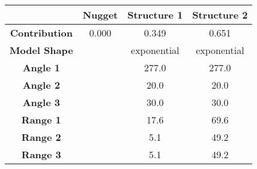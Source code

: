 \begin{tabular}{cccc}
\toprule
{} & Nugget &  Structure 1 &  Structure 2 \\
\midrule
\textbf{Contribution} &  0.000 &        0.349 &        0.651 \\
\textbf{Model Shape } &        &  exponential &  exponential \\
\textbf{Angle 1     } &        &        277.0 &        277.0 \\
\textbf{Angle 2     } &        &         20.0 &         20.0 \\
\textbf{Angle 3     } &        &         30.0 &         30.0 \\
\textbf{Range 1     } &        &         17.6 &         69.6 \\
\textbf{Range 2     } &        &          5.1 &         49.2 \\
\textbf{Range 3     } &        &          5.1 &         49.2 \\
\bottomrule
\end{tabular}
